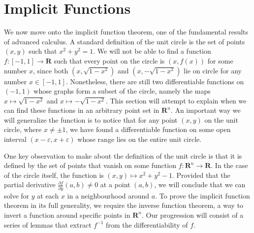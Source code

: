 \documentclass[12pt]{amsbook}
\theoremstyle{plain}
\theoremstyle{definition}
\begin{document}
\chapter{Implicit Functions}

We now move onto the implicit function theorem, one of the fundamental results of advanced calculus. A standard definition of the unit circle is the set of points $(x,y)$ such that $x^2 + y^2 = 1$. We will not be able to find a function $f:[-1,1] \to \mathbf{R}$ such that every point on the circle is $(x,f(x))$ for some number $x$, since both $(x, \sqrt{1 - x^2})$ and $(x, -\sqrt{1 - x^2})$ lie on circle for any number $x \in [-1, 1]$. Nonetheless, there are still two differentiable functions on $(-1,1)$ whose graphs form a subset of the circle, namely the maps $x \mapsto \sqrt{1 - x^2}$ and $x \mapsto -\sqrt{1 - x^2}$. This section will attempt to explain when we can find these functions in an arbitrary point set in $\mathbf{R}^n$. An important way we will generalize the function is to notice that for any point $(x,y)$ on the unit circle, where $x \neq \pm 1$, we have found a differentiable function on some open interval $(x - \varepsilon, x + \varepsilon)$ whose range lies on the entire unit circle.

One key observation to make about the definition of the unit circle is that it is defined by the set of points that vanish on some function $f:\mathbf{R}^n \to \mathbf{R}$. In the case of the circle itself, the function is $(x,y) \mapsto x^2 + y^2 - 1$. Provided that the partial derivative $\frac{\partial f}{\partial y} (a,b) \neq 0$ at a point $(a,b)$, we will conclude that we can solve for $y$ at each $x$ in a neighbourhood around $a$. To prove the implicit function theorem in its full generality, we require the inverse function theorem, a way to invert a function around specific points in $\mathbf{R}^n$. Our progression will consist of a series of lemmas that extract $f^{-1}$ from the differentiability of $f$.
\end{document}
